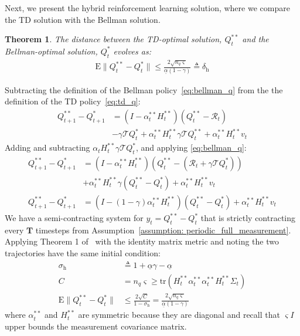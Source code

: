 \documentclass[journal]{IEEEtran}
\newtheorem{theorem}{Theorem}
\newcommand{\E}{\mathrm{E}}
\begin{document}
Next, we present the hybrid reinforcement learning solution, where we compare the TD solution with the Bellman solution. 
\begin{theorem}
    \label{thm:hybrid_rl}
    The distance between the TD-optimal solution, $Q^{**}_t$ and the Bellman-optimal solution, $Q^*_t$ evolves as:
    \begin{align*}
        \E \| Q^{**}_{t} - Q^{*}_t \| \leq \frac{ 2 \sqrt{n_q \varsigma}}{ \underline{\alpha}(1-\gamma)} \triangleq \delta_\mathrm{h}
    \end{align*}
\end{theorem}
\begin{IEEEproof}
    Subtracting the definition of the Bellman policy~\eqref{eq:bellman_q} from the the definition of the TD policy~\eqref{eq:td_q}:
    \begin{align*}
        Q^{**}_{t+1} - Q^{*}_{t+1} &= 
        (I - \alpha^{**}_t H^{**}_t) (Q^{**}_{t} - \mathcal{R}_t) \\
        &- \gamma \mathcal{T} Q_t^* + \alpha^{**}_t H_t^{**} \gamma \mathcal{T} Q_t^{**} + \alpha^{**}_t H_t^{**} v_t
    \end{align*}
    Adding and subtracting $\alpha_t H_t^{**} \gamma \mathcal{T} Q_{t}^*$, and applying \eqref{eq:bellman_q}:
    \begin{align*}
        Q^{**}_{t+1} - Q^{*}_{t+1} &= 
        (I - \alpha^{**}_t H^{**}_t) (Q^{**}_{t} - (\mathcal{R}_t + \gamma \mathcal{T} Q_{t}^*)) \\
        & + \alpha^{**}_t H^{**}_t \gamma (Q^{**}_t - Q^*_t) + \alpha^{**}_t H^{**}_t v_t \\ 
        Q^{**}_{t+1} - Q^{*}_{t+1} &= (I - (1 - \gamma) \alpha^{**}_t H^{**}_t)(Q^{**}_{t} - Q^*_t) + \alpha^{**}_t H^{**}_t v_t
    \end{align*}
    We have a semi-contracting system for $y_t = Q^{**}_t - Q^*_t$ that is strictly contracting every $\boldsymbol{T}$ timesteps from Assumption~\ref{assumption: periodic_full_measurement}. Applying Theorem 1 of~\cite{Pham08} with the identity matrix metric and noting the two trajectories have the same initial condition:
    \begin{align*}
        \sigma_\mathrm{h} &\triangleq 1 + \underline{\alpha} \gamma - \underline{\alpha} \\ 
        C &= n_q \varsigma \geq \mathrm{tr}( H^{**}_t \alpha^{**}_t \alpha^{**}_t H^{**}_t \Sigma_t ) \\
        \E \| Q^{**}_{t} - Q^{*}_{t} \| &\leq \frac{ 2 \sqrt{C}}{ 1 - \sigma_\mathrm{h}} = \frac{ 2 \sqrt{n_q \varsigma}}{ \underline{\alpha}(1-\gamma)} 
    \end{align*} where $\alpha^{**}_t$ and $H^{**}_t$ are symmetric because they are diagonal and recall that $\varsigma I$ upper bounds the measurement covariance matrix.
\end{IEEEproof}
\end{document}
